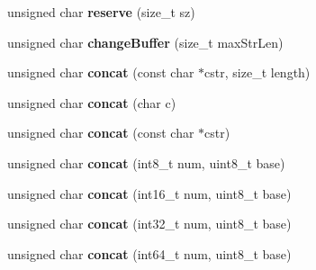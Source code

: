 \begin{DoxyCompactItemize}
\item 
unsigned char {\bfseries reserve} (size\+\_\+t sz)\hypertarget{classgxx_1_1basic__string_aa28d8acfdef6cdc7219c99e263de1d6f}{}\label{classgxx_1_1basic__string_aa28d8acfdef6cdc7219c99e263de1d6f}

\item 
unsigned char {\bfseries change\+Buffer} (size\+\_\+t max\+Str\+Len)\hypertarget{classgxx_1_1basic__string_ab1b9c34bd19917bd75bc4588375e0b5d}{}\label{classgxx_1_1basic__string_ab1b9c34bd19917bd75bc4588375e0b5d}

\item 
unsigned char {\bfseries concat} (const char $\ast$cstr, size\+\_\+t length)\hypertarget{classgxx_1_1basic__string_af9d3474e6020296ff5834b9cc020886c}{}\label{classgxx_1_1basic__string_af9d3474e6020296ff5834b9cc020886c}

\item 
unsigned char {\bfseries concat} (char c)\hypertarget{classgxx_1_1basic__string_a66da792a10430b3187b8b2ba59d3503a}{}\label{classgxx_1_1basic__string_a66da792a10430b3187b8b2ba59d3503a}

\item 
unsigned char {\bfseries concat} (const char $\ast$cstr)\hypertarget{classgxx_1_1basic__string_aeeba3c5dde2f85ca2598ecd5ff83f7f6}{}\label{classgxx_1_1basic__string_aeeba3c5dde2f85ca2598ecd5ff83f7f6}

\item 
unsigned char {\bfseries concat} (int8\+\_\+t num, uint8\+\_\+t base)\hypertarget{classgxx_1_1basic__string_ab89ef969b937e9f566a08115b21943fe}{}\label{classgxx_1_1basic__string_ab89ef969b937e9f566a08115b21943fe}

\item 
unsigned char {\bfseries concat} (int16\+\_\+t num, uint8\+\_\+t base)\hypertarget{classgxx_1_1basic__string_af2f97b213c83a635249b834ff1ffb75b}{}\label{classgxx_1_1basic__string_af2f97b213c83a635249b834ff1ffb75b}

\item 
unsigned char {\bfseries concat} (int32\+\_\+t num, uint8\+\_\+t base)\hypertarget{classgxx_1_1basic__string_af2d84b0988a87bd5a0187ae9bdcdda1a}{}\label{classgxx_1_1basic__string_af2d84b0988a87bd5a0187ae9bdcdda1a}

\item 
unsigned char {\bfseries concat} (int64\+\_\+t num, uint8\+\_\+t base)\hypertarget{classgxx_1_1basic__string_a8d0b6ecd9af4ec7537e2e64f9e411a61}{}\label{classgxx_1_1basic__string_a8d0b6ecd9af4ec7537e2e64f9e411a61}


\end{DoxyCompactItemize}
